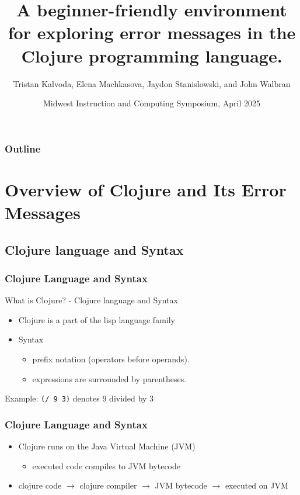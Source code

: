 \documentclass{beamer}
\begin{document}
\title{A beginner-friendly environment for exploring error messages in the Clojure programming language.}
\author{Tristan Kalvoda, Elena Machkasova, Jaydon Stanislowski, and John Walbran}
\date[]  
{Midwest Instruction and Computing Symposium, April 2025}

\begin{frame}
  \titlepage
\end{frame}

\begin{frame}

  \frametitle{Outline}
\tableofcontents
\end{frame}

\section{Overview of Clojure and Its Error Messages}

\subsection{Clojure language and Syntax}
\begin{frame}
\frametitle{Clojure Language and Syntax}
What is Clojure? - Clojure language and Syntax
\begin{itemize}
  \item Clojure is a part of the lisp language family
  \item Syntax
  \begin{itemize}
    \item prefix notation (operators before operands).
    \item expressions are surrounded by parentheses.
  \end{itemize}
\end{itemize}
Example: \texttt{(/ 9 3)} denotes 9 divided by 3
\end{frame}

\begin{frame}
  \frametitle{Clojure Language and Syntax}
  \begin{itemize}
    \item Clojure runs on the Java Virtual Machine (JVM)
    \begin{itemize}
      \item executed code compiles to JVM bytecode
    \end{itemize}
    \item clojure code \(\rightarrow\) clojure compiler \(\rightarrow\) JVM bytecode \(\rightarrow\) executed on JVM
  \end{itemize}
\end{frame}
\end{document}
